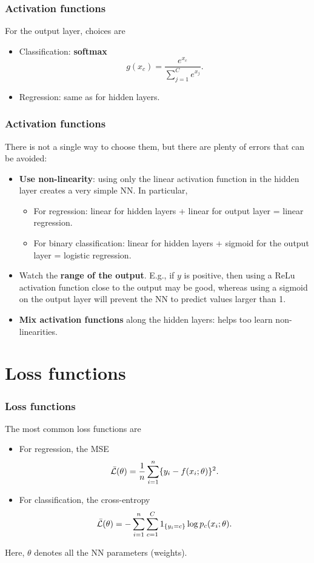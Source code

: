 \begin{frame}
\frametitle{Activation functions}
For the output layer, choices are
\begin{itemize}
\item Classification: {\bf softmax}
$$
g(x_c) = \frac{e^{x_c}}{\sum_{j=1}^C e^{x_j}}.
$$
\item Regression: same as for hidden layers.
\end{itemize}
\end{frame}
\begin{frame}
\frametitle{Activation functions}
There is not a single way to choose them, but there are plenty of errors that can be avoided:
\begin{itemize}
\item {\bf Use non-linearity}: using only the linear activation function in the hidden layer creates a very simple NN. In particular,
\begin{itemize}
\item For regression: linear for hidden layers + linear for output layer = linear regression.
\item For binary classification:  linear for hidden layers + sigmoid for the output layer = logistic regression.
\end{itemize}
\item Watch the {\bf range of the output}. E.g., if $y$ is positive, then using a ReLu activation function close to the output may be good, whereas using a sigmoid on the output layer will prevent the NN to predict values larger than 1.
\item {\bf Mix activation functions} along the hidden layers: helps too learn non-linearities.
\end{itemize}
\end{frame}
\section{Loss functions}
\begin{frame}
\frametitle{Loss functions}
The most common loss functions are
\begin{itemize}
\item For regression, the MSE
$$
\bar{\cal L}(\theta) = \frac{1}{n} \sum_{i=1}^n \{y_i - f(x_i;\theta)\}^2.
$$
\item For classification, the cross-entropy
$$
\bar{\cal L}(\theta) = -\sum_{i=1}^n \sum_{c=1}^C 1_{\{y_i=c\}} \log p_c(x_i;\theta).
$$
\end{itemize}
Here, $\theta$ denotes all the NN parameters (weights). 
\end{frame}
